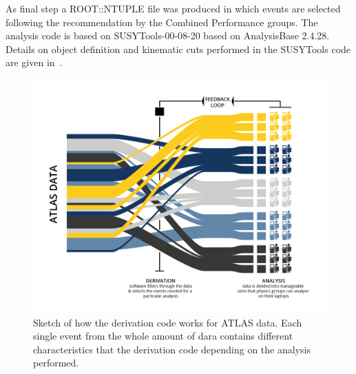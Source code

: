 As final step a ROOT::NTUPLE file was produced in which events are selected following the recommendation by the Combined Performance groups. The analysis code is based on SUSYTools-00-08-20 based on AnalysisBase 2.4.28. Details on object definition and kinematic cuts performed in the SUSYTools code are given in~\cite{twiki:SUSYTools}.


\begin{figure}[tb]
\centering
\includegraphics[width=.48\textwidth]{MCSample/Derivation}
\caption{Sketch of how the derivation code works for ATLAS data. Each single event from the whole amount of dara contains different characteristics that the derivation code depending on the analysis performed.}
\label{fig:derivation}
\end{figure}















